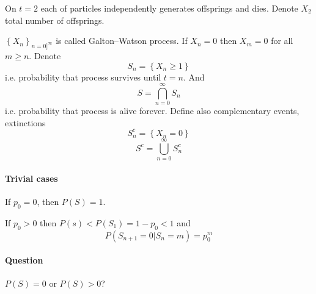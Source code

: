 On $t=2$ each of particles independently generates offsprings and dies. Denote $X_2$ total number of offsprings.

$\left\{ X_n \right\}_{n=0]^\infty}$ is called Galton–Watson process. If $X_n=0$ then $X_m = 0$ for all $m \geq n$. Denote
$$S_n = \left\{ X_n \geq 1 \right\}$$
i.e. probability that process survives until $t=n$. And
$$S = \bigcap_{n=0}^\infty S_n$$
i.e. probability that process is alive forever. Define also complementary events, extinctions
$$S^c_n = \left\{ X_n = 0 \right\}$$
$$S^c = \bigcup_{n=0}^\infty S^c_n$$
\paragraph{Trivial cases}
If $p_0 = 0$, then $P(S) = 1$.

If $p_0 > 0$ then $P(s) < P(S_1) = 1 - p_0 < 1$ and 
$$P(S_{n+1} = 0 | S_n = m) = p_0^m$$

\paragraph{Question} $P(S) = 0$ or $P(S) > 0$?